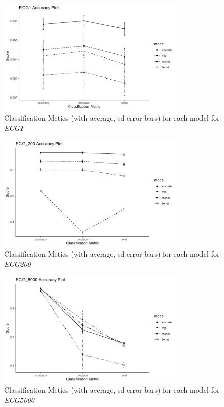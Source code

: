 \documentclass[journal]{IEEEtran}
\begin{document}
\begin{figure}[h]
    \centering
    \includegraphics[width=3.5in]{assets/ecg1_accuracy_plot.png}
    
    \caption{Classification Metics (with average, sd error bars) for each model for \textit{ECG1}}
    \label{fig:ecg1-accuracy}
    
\end{figure}

\begin{figure}[h]
    \centering
    \includegraphics[width=3.5in]{assets/ecg200_accuracy_plot.png}
    
    \caption{Classification Metics (with average, sd error bars) for each model for \textit{ECG200}}
    \label{fig:ecg200-accuracy}
    
\end{figure}

\begin{figure}[h]
    \centering
    \includegraphics[width=3.5in]{assets/ecg5000_accuracy_plot.png}
    
    \caption{Classification Metics (with average, sd error bars) for each model for \textit{ECG5000}}
    \label{fig:ecg5000-accuracy}
    
\end{figure}
\end{document}
